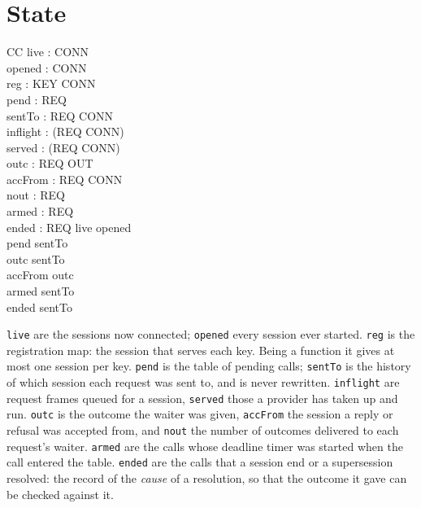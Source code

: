 \documentclass[a4paper,10pt,fleqn]{article}
\begin{document}
\section{State}

\begin{schema}{CC}
  live : \power CONN \\
  opened : \power CONN \\
  reg : KEY \pfun CONN \\
  pend : \power REQ \\
  sentTo : REQ \pfun CONN \\
  inflight : \power (REQ \cross CONN) \\
  served : \power (REQ \cross CONN) \\
  outc : REQ \pfun OUT \\
  accFrom : REQ \pfun CONN \\
  nout : REQ   \\
  armed : \power REQ \\
  ended : \power REQ
\where
  live \subseteq opened \\
  pend \subseteq \dom sentTo \\
  \dom outc \subseteq \dom sentTo \\
  \dom accFrom \subseteq \dom outc \\
  armed \subseteq \dom sentTo \\
  ended \subseteq \dom sentTo
\end{schema}

\texttt{live} are the sessions now connected; \texttt{opened} every session
ever started.  \texttt{reg} is the registration map: the session that serves
each key.  Being a function it gives at most one session per key.
\texttt{pend} is the table of pending calls; \texttt{sentTo} is the history
of which session each request was sent to, and is never rewritten.
\texttt{inflight} are request frames queued for a session, \texttt{served}
those a provider has taken up and run.  \texttt{outc} is the outcome the
waiter was given, \texttt{accFrom} the session a reply or refusal was
accepted from, and \texttt{nout} the number of outcomes delivered to each
request's waiter.  \texttt{armed} are the calls whose deadline timer was
started when the call entered the table.  \texttt{ended} are the calls that
a session end or a supersession resolved: the record of the \emph{cause} of
a resolution, so that the outcome it gave can be checked against it.
\end{document}

